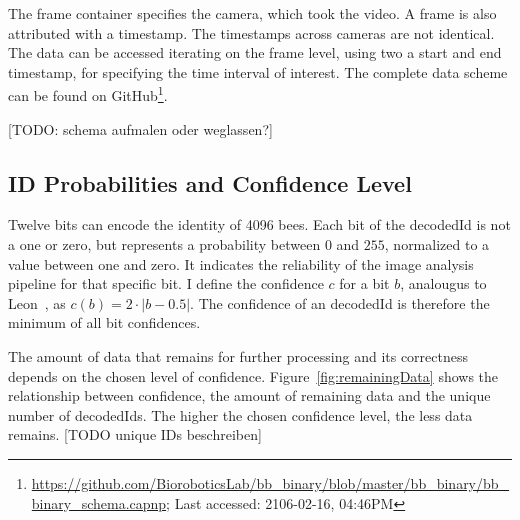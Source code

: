 The frame container specifies the camera, which took the video. A frame is also attributed with a timestamp. The timestamps across cameras are not identical. The data can be accessed iterating on the frame level, using two a start and end timestamp, for specifying the time interval of interest. The complete data scheme can be found on GitHub\footnote{\url{https://github.com/BioroboticsLab/bb_binary/blob/master/bb_binary/bb_binary_schema.capnp}; Last accessed: 2106-02-16, 04:46PM}. 

[TODO: schema aufmalen oder weglassen?]\\



\subsection{ID Probabilities and Confidence Level}
\label{subsec:confidence}
Twelve bits can encode the identity of 4096 bees.
Each bit of the decodedId is not a one or zero, but represents a probability between $0$ and $255$, normalized to a value between one and zero. It indicates the reliability of the image analysis pipeline for that specific bit.
I define the confidence $c$ for a bit $b$, analougus to Leon~\textcite[p.~14]{leon2016}, as $c(b)=2\cdot|b-0.5|$. The confidence of an decodedId is therefore the minimum of all bit confidences.

The amount of data that remains for further processing and its correctness depends on the chosen level of confidence. Figure~\ref{fig:remainingData} shows the relationship between confidence, the amount of remaining data and the unique number of decodedIds. The higher the chosen confidence level, the less data remains. [TODO unique IDs beschreiben]

